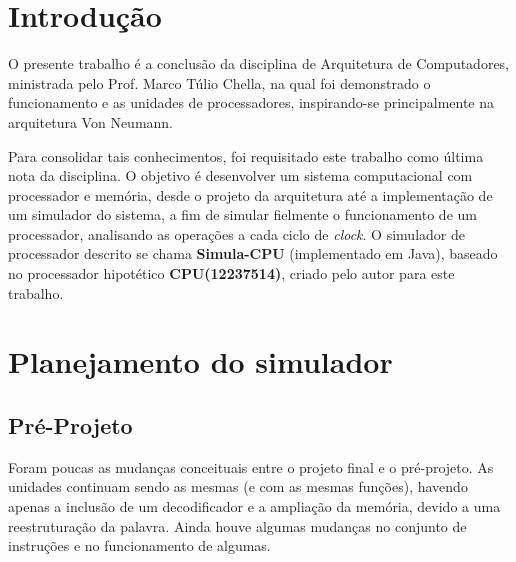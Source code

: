 \documentclass[
	12pt,				%
	oneside,			%
	a4paper,			%
	english,			%
	french,				%
	spanish,			%
	brazil,				%
	]{abntex2}
\begin{document}
{%

\tableofcontents*
\cleardoublepage


\textual

\chapter*[Introdução]{Introdução}
O presente trabalho é a conclusão da disciplina de Arquitetura de Computadores,
ministrada pelo Prof. Marco Túlio Chella, na qual foi demonstrado o
funcionamento e as unidades de processadores, inspirando-se principalmente na
arquitetura Von Neumann.

Para consolidar tais conhecimentos, foi requisitado este trabalho como última
nota da disciplina. O objetivo é desenvolver um sistema computacional com
processador e memória, desde o projeto da arquitetura até a implementação de um
simulador do sistema, a fim de simular fielmente o funcionamento de um
processador, analisando as operações a cada ciclo de \textit{clock}. O simulador de
processador descrito se chama \textbf{Simula-CPU} (implementado em Java),
baseado no processador hipotético \textbf{CPU(12237514)}, criado pelo autor para este
trabalho.


\chapter[Planejamento do Simulador]{Planejamento do simulador}
\section{Pré-Projeto}
Foram poucas as mudanças conceituais entre o projeto final e o pré-projeto. As
unidades continuam sendo as mesmas (e com as mesmas funções), havendo apenas a
inclusão de um decodificador e a ampliação da memória, devido a uma
reestruturação da palavra. Ainda houve algumas mudanças no conjunto de
instruções e no funcionamento de algumas.

}
\end{document}
